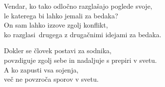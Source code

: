 Vendar, ko tako odločno razglašajo poglede svoje,\\
le katerega bi lahko jemali za bedaka?\\
On sam lahko izzove zgolj konflikt,\\
ko razglasi drugega z drugačnimi idejami za bedaka.

Dokler se človek postavi za sodnika,\\
povzdiguje zgolj sebe in nadaljuje s prepiri v svetu.\\
A ko zapusti vsa sojenja,\\
več ne povzroča sporov v svetu.

